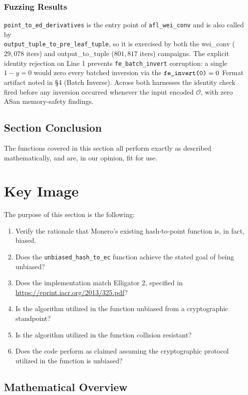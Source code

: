 \documentclass[12pt,titlepage,table]{article}
\begin{document}
\subsubsection{Fuzzing Results}
\verb+point_to_ed_derivatives+ is the entry point of \verb+afl_wei_conv+ and is also called by \\ \verb+output_tuple_to_pre_leaf_tuple+, so it is exercised by both the wei\_conv ($29{,}078$ iters) and output\_to\_tuple ($801{,}817$ iters) campaigns.  The explicit identity rejection on Line 1 prevents \verb+fe_batch_invert+ corruption: a single $1 - y = 0$ would zero every batched inversion via the $\verb+fe_invert(0)+ = 0$ Fermat artifact noted in \S 4 (Batch Inverse).  Across both harnesses the identity check fired before any inversion occurred whenever the input encoded $\mathcal{O}$, with zero ASan memory-safety findings.

\subsection[Section Conclusion]{Section Conclusion \hfill \checkmark}
The functions covered in this section all perform exactly as described mathematically, and are, in our opinion, fit for use.

\newpage
\section{Key Image}
The purpose of this section is the following:
\begin{enumerate}
\item Verify the rationale that Monero's existing hash-to-point function is, in fact, biased.
\item Does the \verb+unbiased_hash_to_ec+ function achieve the stated goal of being unbiased?
\item Does the implementation match Elligator 2, specified in \\ {\small\url{https://eprint.iacr.org/2013/325.pdf}}?
\item Is the algorithm utilized in the function unbiased from a cryptographic standpoint?
\item Is the algorithm utilized in the function collision resistant?
\item Does the code perform as claimed assuming the cryptographic protocol utilized in the function is unbiased?
\end{enumerate}

\subsection{Mathematical Overview}
\end{document}
